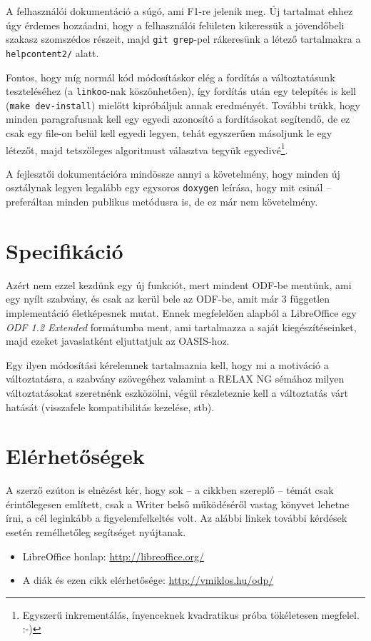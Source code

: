 \documentclass[a4paper]{report}
\begin{document}
A felhasználói dokumentáció a súgó, ami F1-re jelenik meg. Új tartalmat ehhez
úgy érdemes hozzáadni, hogy a felhasználói felületen kikeressük a jövendőbeli
szakasz szomszédos részeit, majd \texttt{git grep}-pel rákeresünk a létező
tartalmakra a \texttt{helpcontent2/} alatt.

Fontos, hogy míg normál kód módosításkor elég a fordítás a változtatásunk
teszteléséhez (a \texttt{linkoo}-nak köszönhetően), így fordítás után egy
telepítés is kell (\texttt{make dev-install}) mielőtt kipróbáljuk annak
eredményét. További trükk, hogy minden paragrafusnak kell egy egyedi azonosító
a fordításokat segítendő, de ez csak egy file-on belül kell egyedi legyen,
tehát egyszerűen másoljunk le egy létezőt, majd tetszőleges algoritmust
választva tegyük egyedivé\footnote{Egyszerű inkrementálás, ínyenceknek
kvadratikus próba tökéletesen megfelel. :-)}.

A fejlesztői dokumentációra mindössze annyi a követelmény, hogy minden új osztálynak
legyen legalább egy egysoros \texttt{doxygen} leírása, hogy mit csinál --
preferáltan minden publikus metódusra is, de ez már nem követelmény.

\section{Specifikáció}

Azért nem ezzel kezdünk egy új funkciót, mert mindent ODF-be mentünk, ami egy nyílt szabvány,
és csak az kerül bele az ODF-be, amit már 3 független implementáció
életképesnek mutat. Ennek megfelelően alapból a LibreOffice egy \emph{ODF 1.2
Extended} formátumba ment, ami tartalmazza a saját kiegészítéseinket, majd
ezeket javaslatként eljuttatjuk az OASIS-hoz.

Egy ilyen módosítási kérelemnek tartalmaznia kell, hogy mi a motiváció a
változtatásra, a szabvány szövegéhez valamint a RELAX NG sémához milyen
változtatásokat szeretnénk eszközölni, végül részleteznie kell a változtatás
várt hatását (visszafele kompatibilitás kezelése, stb).

\section{Elérhetőségek}

A szerző ezúton is elnézést kér, hogy sok -- a cikkben szereplő -- témát
csak érintőlegesen említett, csak a Writer belső működéséről vastag könyvet
lehetne írni, a cél leginkább a figyelemfelkeltés volt.  Az alábbi linkek
további kérdések esetén remélhetőleg segítséget nyújtanak.

\begin{itemize}
\item LibreOffice honlap: \url{http://libreoffice.org/}
\item A diák és ezen cikk elérhetősége: \url{http://vmiklos.hu/odp/}
\end{itemize}
\end{document}
